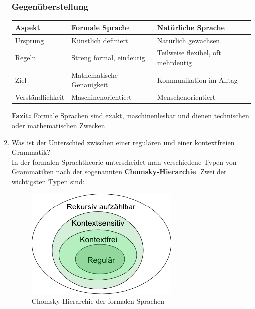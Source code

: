 \documentclass[a4paper,12pt]{article}
\begin{document}
\begin{enumerate}
			\subsubsection*{Gegenüberstellung}
			
			\begin{tabular}{|l|p{6cm}|p{6cm}|}
				\hline
				\textbf{Aspekt} & \textbf{Formale Sprache} & \textbf{Natürliche Sprache} \\
				\hline
				Ursprung & Künstlich definiert & Natürlich gewachsen \\
				\hline
				Regeln & Streng formal, eindeutig & Teilweise flexibel, oft mehrdeutig \\
				\hline
				Ziel & Mathematische Genauigkeit & Kommunikation im Alltag \\
				\hline
				Verständlichkeit & Maschinenorientiert & Menschenorientiert \\
				\hline
			\end{tabular}
			
			\vspace{1em}
			
			\textbf{Fazit:}  
			Formale Sprachen sind exakt, maschinenlesbar und dienen technischen oder mathematischen Zwecken.
			
			\item Was ist der Unterschied zwischen einer regulären und einer kontextfreien Grammatik?\\
			
			In der formalen Sprachtheorie unterscheidet man verschiedene Typen von Grammatiken nach der sogenannten \textbf{Chomsky-Hierarchie}. Zwei der wichtigsten Typen sind:
			\begin{figure}[h]
				\centering
				\includegraphics[width=0.7\textwidth]{Chomsky-Hierarchie.png}
				\caption{Chomsky-Hierarchie der formalen Sprachen}
				\label{fig:chomsky-hierarchie}
			\end{figure}
			

\end{enumerate}
\end{document}
